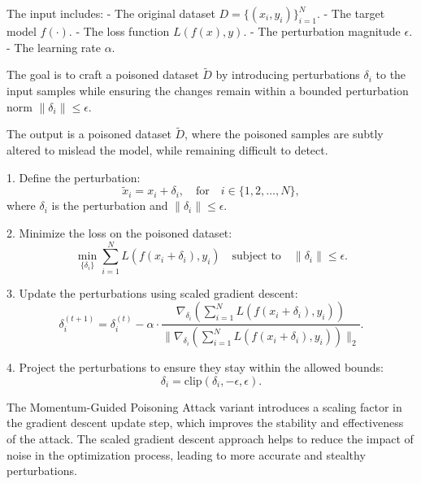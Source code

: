 The input includes:
- The original dataset \( D = \{(x_i, y_i)\}_{i=1}^{N} \).
- The target model \( f(\cdot) \).
- The loss function \( L(f(x), y) \).
- The perturbation magnitude \( \epsilon \).
- The learning rate \( \alpha \).

The goal is to craft a poisoned dataset \( \tilde{D} \) by introducing perturbations \( \delta_i \) to the input samples while ensuring the changes remain within a bounded perturbation norm \( \|\delta_i\| \leq \epsilon \).


The output is a poisoned dataset $\tilde{D}$, where the poisoned samples are subtly altered to mislead the model, while remaining difficult to detect.

1. Define the perturbation:
   \[
   \tilde{x}_i = x_i + \delta_i, \quad \text{for} \quad i \in \{1, 2, \dots, N\},
   \]
   where $\delta_i$ is the perturbation and $\|\delta_i\| \leq \epsilon$.

2. Minimize the loss on the poisoned dataset:
   \[
   \min_{\{\delta_i\}} \sum_{i=1}^{N} L(f(x_i + \delta_i), y_i) \quad \text{subject to} \quad \|\delta_i\| \leq \epsilon.
   \]

3. Update the perturbations using scaled gradient descent:
   \[
   \delta_i^{(t+1)} = \delta_i^{(t)} - \alpha \cdot \frac{\nabla_{\delta_i} \left( \sum_{i=1}^{N} L(f(x_i + \delta_i), y_i) \right)}{\|\nabla_{\delta_i} \left( \sum_{i=1}^{N} L(f(x_i + \delta_i), y_i) \right)\|_{2}}.
   \]

4. Project the perturbations to ensure they stay within the allowed bounds:
   \[
   \delta_i = \text{clip}(\delta_i, -\epsilon, \epsilon).
   \]

The Momentum-Guided Poisoning Attack variant introduces a scaling factor in the gradient descent update step, which improves the stability and effectiveness of the attack. The scaled gradient descent approach helps to reduce the impact of noise in the optimization process, leading to more accurate and stealthy perturbations.